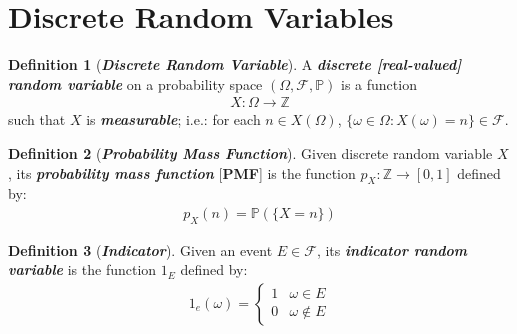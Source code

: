\documentclass[12pt]{extarticle}
\newcommand{\term}[1]{\textbf{\textit{#1}}}
\theoremstyle{definition}
\newtheorem*{definition}{Definition}
\theoremstyle{remark}
\newcommand{\prob}[1]{\mathbb{P}\left(#1\right)}
\begin{document}
\pagebreak
\section{Discrete Random Variables}
\begin{tcolorbox}[colback=blue!50!green!15!white]
    \begin{definition}[\term{Discrete Random Variable}]
        A \term{discrete [real-valued] random variable} on a probability 
space $(\Omega, \mathcal{F}, \mathbb{P})$ is a function \begin{align*}
            X:\Omega\to\mathbb{Z}
        \end{align*}
        such that $X$ is \term{measurable}; i.e.: for each $n\in 
X(\Omega)$, $\{\omega\in\Omega:X(\omega)=n\}\in\mathcal{F}$.
    \end{definition}
\end{tcolorbox}

\begin{tcolorbox}[colback=blue!70!green!15!white]
    \begin{definition}[\term{Probability Mass Function}]
        Given discrete random variable $X$, its \term{probability mass 
function} [\textbf{PMF}] is the function $p_X:\mathbb{Z}\to[0,1]$ defined 
by: \begin{align*}
            p_X(n)=\prob{\{X=n\}}
        \end{align*}
    \end{definition}
\end{tcolorbox}

\begin{definition}[\term{Indicator}]
    Given an event $E\in\mathcal{F}$, its \term{indicator random variable} 
is the function $1_E$ defined by: \begin{align*}
        1_e(\omega)=\begin{cases}
            1 & \omega\in E \\
            0 & \omega\not\in E
        \end{cases}
    \end{align*}
\end{definition}

~\\
\end{document}
